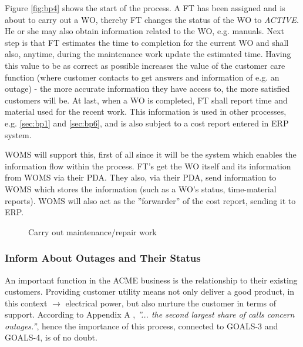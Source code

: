 Figure \ref{fig:bp4} shows the start of the process. A FT has been assigned and is about to carry out a WO, thereby FT changes the status of the WO to \emph{ACTIVE}. He or she may also obtain information related to the WO, e.g. manuals. Next step is that FT estimates the time to completion for the current WO and shall also, anytime, during the maintenance work update the estimated time. Having this value to be as correct as possible increases the value of the customer care function (where customer contacts to get answers and information of e.g. an outage) - the more accurate information they have access to, the more satisfied customers will be. At last, when a WO is completed, FT shall report time and material used for the recent work. This information is used in other processes, e.g. \ref{sec:bp1} and \ref{sec:bp6}, and is also subject to a cost report entered in ERP system.

WOMS will support this, first of all since it will be the system which enables the information flow within the process. FT's get the WO itself and its information from WOMS via their PDA. They also, via their PDA, send information to WOMS which stores the information (such as a WO's status, time-material reports). WOMS will also act as the ''forwarder'' of the cost report, sending it to ERP.
\begin{figure}[H]
	\centering
	\setlength\fboxsep{7pt}
	\setlength\fboxrule{0.5pt}
	\label{fig:carry}
	\caption{Carry out maintenance/repair work}
\end{figure}
%
\subsubsection{Inform About Outages and Their Status}
\label{bp5}
An important function in the ACME business is the relationship to their existing customers. Providing customer utility means not only deliver a good product, in this context $\rightarrow$ electrical power, but also nurture the customer in terms of support. According to Appendix A \cite{appendixA}, \emph{''... the second largest share of calls concern outages.''}, hence the importance of this process, connected to GOALS-3 and GOALS-4, is of no doubt. 

